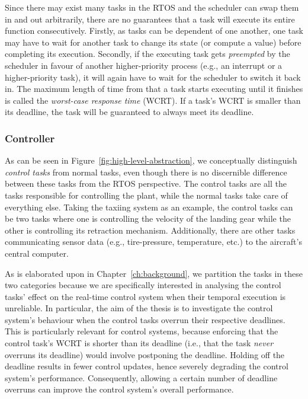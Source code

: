 Since there may exist many tasks in the RTOS and the scheduler can swap them in and out arbitrarily, there are no guarantees that a task will execute its entire function consecutively.
Firstly, as tasks can be dependent of one another, one task may have to wait for another task to change its state (or compute a value) before completing its execution.
Secondly, if the executing task gets \emph{preempted} by the scheduler in favour of another higher-priority process (e.g., an interrupt or a higher-priority task), it will again have to wait for the scheduler to switch it back in.
The maximum length of time from that a task starts executing until it finishes is called the \emph{worst-case response time} (WCRT).
If a task's WCRT is smaller than its deadline, the task will be guaranteed to always meet its deadline.

\subsubsection{Controller}%
%
As can be seen in Figure~\ref{fig:high-level-abstraction}, we conceptually distinguish \emph{control tasks} from normal tasks, even though there is no discernible difference between these tasks from the RTOS perspective.
The control tasks are all the tasks responsible for controlling the plant, while the normal tasks take care of everything else.
Taking the taxiing system as an example, the control tasks can be two tasks where one is controlling the velocity of the landing gear while the other is controlling its retraction mechanism.
Additionally, there are other tasks communicating sensor data (e.g., tire-pressure, temperature, etc.) to the aircraft's central computer.

As is elaborated upon in Chapter~\ref{ch:background}, we partition the tasks in these two categories because we are specifically interested in analysing the control tasks' effect on the real-time control system when their temporal execution is unreliable.
In particular, the aim of the thesis is to investigate the control system's behaviour when the control tasks overrun their respective deadlines.
This is particularly relevant for control systems, because enforcing that the control task's WCRT is shorter than its deadline (i.e., that the task \emph{never} overruns its deadline) would involve postponing the deadline.
Holding off the deadline results in fewer control updates, hence severely degrading the control system's performance.
Consequently, allowing a certain number of deadline overruns can improve the control system's overall performance.

